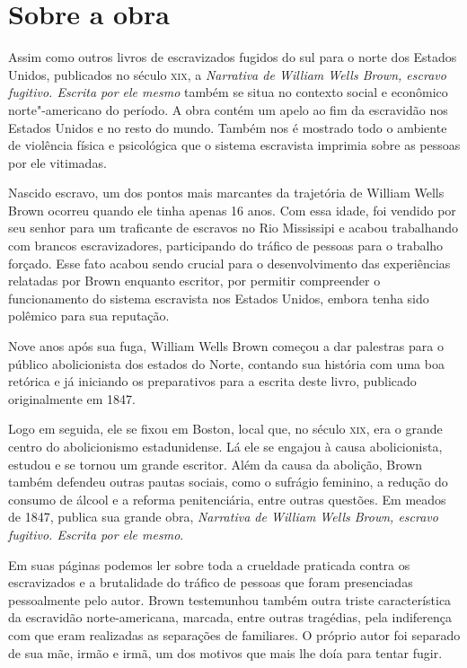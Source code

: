 \section{Sobre a obra}

Assim como outros livros de escravizados fugidos do sul para o norte dos
Estados Unidos, publicados no século \textsc{xix}, a \emph{Narrativa de William
Wells Brown, escravo fugitivo. Escrita por ele mesmo} também se situa no contexto social e
econômico norte"-americano do período.
A obra contém um apelo ao fim da escravidão nos Estados Unidos
e no resto do mundo. Também nos é mostrado todo o ambiente de violência
física e psicológica que o sistema escravista imprimia sobre as pessoas
por ele vitimadas.

Nascido escravo, um dos pontos mais marcantes da trajetória de William
Wells Brown ocorreu quando ele tinha apenas 16 anos. Com essa idade, foi
vendido por seu senhor para um traficante de escravos no Rio Mississipi
e acabou trabalhando com brancos escravizadores, participando do tráfico
de pessoas para o trabalho forçado. Esse fato acabou sendo crucial para
o desenvolvimento das experiências relatadas por Brown enquanto
escritor, por permitir compreender o funcionamento do sistema escravista
nos Estados Unidos, embora tenha sido polêmico para sua reputação.

Nove anos após sua fuga, William Wells Brown começou a dar palestras
para o público abolicionista dos estados do Norte, contando sua história
com uma boa retórica e já iniciando os preparativos para a escrita deste
livro, publicado originalmente em 1847.

Logo em seguida, ele se fixou em Boston, local que, no século \textsc{xix}, era o
grande centro do abolicionismo estadunidense. Lá ele se engajou à causa
abolicionista, estudou e se tornou um grande escritor. Além da causa da
abolição, Brown também defendeu outras pautas sociais, como o sufrágio
feminino, a redução do consumo de álcool e a reforma penitenciária,
entre outras questões. Em meados de 1847, publica sua grande obra,
\emph{Narrativa de William Wells Brown, escravo fugitivo. Escrita por ele mesmo}.

Em suas páginas podemos ler sobre toda a crueldade praticada
contra os escravizados e a brutalidade do tráfico de pessoas que foram presenciadas pessoalmente pelo autor.
Brown testemunhou também outra triste característica da escravidão
norte-americana, marcada, entre outras tragédias, pela indiferença com
que eram realizadas as separações de familiares. O próprio autor foi
separado de sua mãe, irmão e irmã, um dos motivos que mais lhe doía para tentar fugir.

